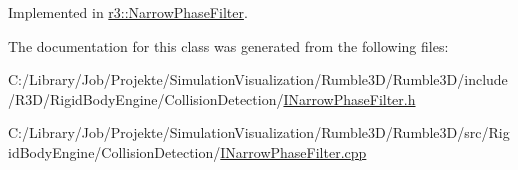 Implemented in \mbox{\hyperlink{classr3_1_1_narrow_phase_filter_a7f7b7a901d5af6e616bc6df677fae086}{r3\+::\+Narrow\+Phase\+Filter}}.



The documentation for this class was generated from the following files\+:\begin{DoxyCompactItemize}
\item 
C\+:/\+Library/\+Job/\+Projekte/\+Simulation\+Visualization/\+Rumble3\+D/\+Rumble3\+D/include/\+R3\+D/\+Rigid\+Body\+Engine/\+Collision\+Detection/\mbox{\hyperlink{_i_narrow_phase_filter_8h}{I\+Narrow\+Phase\+Filter.\+h}}\item 
C\+:/\+Library/\+Job/\+Projekte/\+Simulation\+Visualization/\+Rumble3\+D/\+Rumble3\+D/src/\+Rigid\+Body\+Engine/\+Collision\+Detection/\mbox{\hyperlink{_i_narrow_phase_filter_8cpp}{I\+Narrow\+Phase\+Filter.\+cpp}}\end{DoxyCompactItemize}
